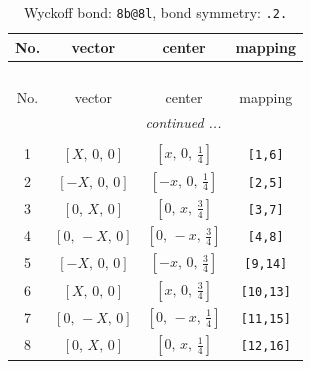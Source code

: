 \documentclass[fleqn,8pt]{jsarticle}
\begin{document}
\begin{longtable}{cccc}
\caption{Wyckoff bond: {\tt 8b@8l}, bond symmetry: {\tt .2.}}
 \\
 \hline \hline
No. & vector & center & mapping \\ \hline \endfirsthead

\multicolumn{3}{l}{\tablename\ \thetable{}} \\
 \hline \hline
No. & vector & center & mapping \\ \hline \endhead

 \hline \hline
\multicolumn{3}{r}{\footnotesize\it continued ...} \\ \endfoot

 \hline \hline
\multicolumn{3}{r}{} \\ \endlastfoot

1 & $\left[ X,\, 0,\, 0 \right]$ & $\left[ x,\, 0,\, \frac{1}{4} \right]$ & {\tt [1,6]} \\ \hline
2 & $\left[ - X,\, 0,\, 0 \right]$ & $\left[ - x,\, 0,\, \frac{1}{4} \right]$ & {\tt [2,5]} \\ \hline
3 & $\left[ 0,\, X,\, 0 \right]$ & $\left[ 0,\, x,\, \frac{3}{4} \right]$ & {\tt [3,7]} \\ \hline
4 & $\left[ 0,\, - X,\, 0 \right]$ & $\left[ 0,\, - x,\, \frac{3}{4} \right]$ & {\tt [4,8]} \\ \hline
5 & $\left[ - X,\, 0,\, 0 \right]$ & $\left[ - x,\, 0,\, \frac{3}{4} \right]$ & {\tt [9,14]} \\ \hline
6 & $\left[ X,\, 0,\, 0 \right]$ & $\left[ x,\, 0,\, \frac{3}{4} \right]$ & {\tt [10,13]} \\ \hline
7 & $\left[ 0,\, - X,\, 0 \right]$ & $\left[ 0,\, - x,\, \frac{1}{4} \right]$ & {\tt [11,15]} \\ \hline
8 & $\left[ 0,\, X,\, 0 \right]$ & $\left[ 0,\, x,\, \frac{1}{4} \right]$ & {\tt [12,16]} \\
\end{longtable}
\renewcommand{\arraystretch}{1.2}
\end{document}
